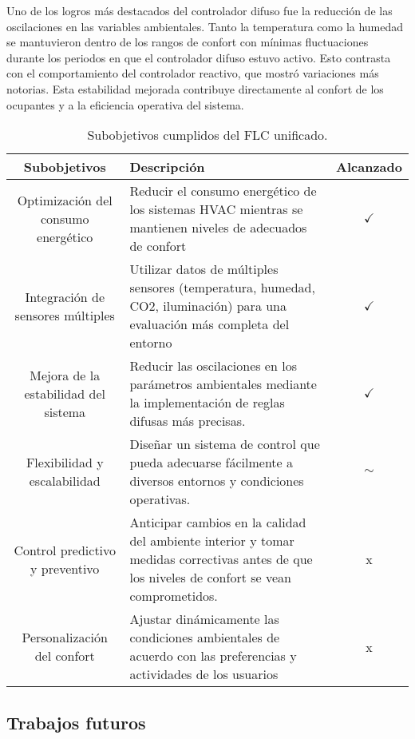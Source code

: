 Uno de los logros más destacados del controlador difuso fue la reducción de las oscilaciones en las variables ambientales. Tanto la temperatura como la humedad se mantuvieron dentro de los rangos de confort con mínimas fluctuaciones durante los periodos en que el controlador difuso estuvo activo. Esto contrasta con el comportamiento del controlador reactivo, que mostró variaciones más notorias. Esta estabilidad mejorada contribuye directamente al confort de los ocupantes y a la eficiencia operativa del sistema.

\begin{table}[H]
	\centering
	\begin{tabular}{| c | p{6.8cm} | c |}
		\hline
		\rowcolor{lightgray}
		\textbf{Subobjetivos} & \textbf{Descripción} & \textbf{Alcanzado} \\
		\hline
		Optimización del consumo energético & 
		Reducir el consumo energético de los sistemas HVAC mientras se mantienen niveles de adecuados de confort & $\checkmark$ \\
		\hline
		Integración de sensores múltiples & 
		Utilizar datos de múltiples sensores (temperatura, humedad, CO2, iluminación) para una evaluación más completa del entorno & $\checkmark$ \\
		\hline
		Mejora de la estabilidad del sistema & 
		Reducir las oscilaciones en los parámetros ambientales mediante la implementación de reglas difusas más precisas. & $\checkmark$ \\
		\hline
		Flexibilidad y escalabilidad & 
		Diseñar un sistema de control que pueda adecuarse fácilmente a diversos entornos y condiciones operativas. & $\sim$ \\
		\hline
		Control predictivo y preventivo & 
		Anticipar cambios en la calidad del ambiente interior y tomar medidas correctivas antes de que los niveles de confort se vean comprometidos. & x \\
		\hline
		Personalización del confort &
		Ajustar dinámicamente las condiciones ambientales de acuerdo con las preferencias y actividades de los usuarios & x \\
		\hline
	\end{tabular}
	\caption{Subobjetivos cumplidos del FLC unificado.}
	\label{tab:subobjetivos-cumplidos}
\end{table}

\subsection{Trabajos futuros}

